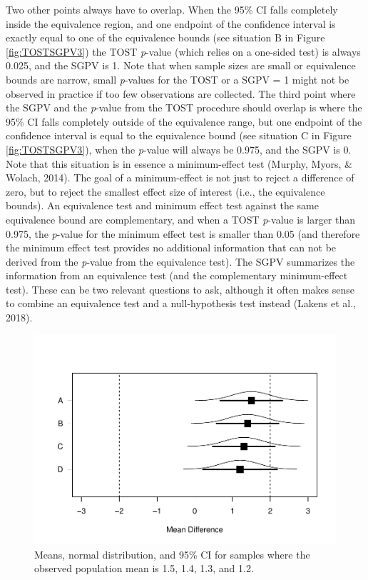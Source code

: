 \documentclass[,man,floatsintext]{apa6}
\begin{document}
Two other points always have to overlap. When the 95\% CI falls completely inside the equivalence region, and one endpoint of the confidence interval is exactly equal to one of the equivalence bounds (see situation B in Figure \ref{fig:TOSTSGPV3}) the TOST \emph{p}-value (which relies on a one-sided test) is always 0.025, and the SGPV is 1. Note that when sample sizes are small or equivalence bounds are narrow, small \emph{p}-values for the TOST or a SGPV = 1 might not be observed in practice if too few observations are collected. The third point where the SGPV and the \emph{p}-value from the TOST procedure should overlap is where the 95\% CI falls completely outside of the equivalence range, but one endpoint of the confidence interval is equal to the equivalence bound (see situation C in Figure \ref{fig:TOSTSGPV3}), when the \emph{p}-value will always be 0.975, and the SGPV is 0. Note that this situation is in essence a minimum-effect test (Murphy, Myors, \& Wolach, 2014). The goal of a minimum-effect is not just to reject a difference of zero, but to reject the smallest effect size of interest (i.e., the equivalence bounds). An equivalence test and minimum effect test against the same equivalence bound are complementary, and when a TOST \emph{p}-value is larger than 0.975, the \emph{p}-value for the minimum effect test is smaller than 0.05 (and therefore the minimum effect test provides no additional information that can not be derived from the \emph{p}-value from the equivalence test). The SGPV summarizes the information from an equivalence test (and the complementary minimum-effect test). These can be two relevant questions to ask, although it often makes sense to combine an equivalence test and a null-hypothesis test instead (Lakens et al., 2018).

\begin{figure}
\centering
\includegraphics{manuscript.R2_files/figure-latex/TOSTSGPV4-1.pdf}
\caption{\label{fig:TOSTSGPV4}Means, normal distribution, and 95\% CI for samples where the observed population mean is 1.5, 1.4, 1.3, and 1.2.}
\end{figure}
\end{document}

